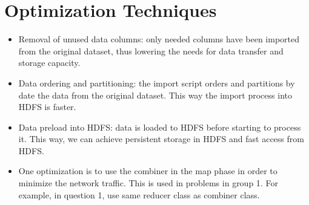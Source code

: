 \documentclass[fontsize=11pt,paper=a4,pagesize=auto]{report}
\begin{document}
\section{Optimization Techniques}
\begin{itemize}
\item Removal of unused data columns: only needed columns have been imported from the original dataset, thus lowering the needs for data transfer and storage capacity.
\item Data ordering and partitioning: the import script orders and partitions by date the data from the original dataset. This way the import process into HDFS is faster.
\item Data preload into HDFS: data  is loaded to HDFS before starting to process it. This way, we can achieve persistent storage in HDFS and fast access from HDFS.
\item One optimization is to use the combiner in the map phase in order to minimize the network traffic. This is used in problems in group 1. For example, in question 1, use same reducer class as combiner class. 

\end{itemize} 
 
\end{document}

